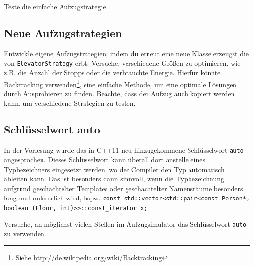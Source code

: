 \begin{algorithm}[H]
 \SetAlgoLined
\end{algorithm}

Teste die einfache Aufzugstrategie

\subsection{Neue Aufzugstrategien}
Entwickle eigene Aufzugstrategien, indem du erneut eine neue Klasse erzeugst die von \lstinline{ElevatorStrategy} erbt.
Versuche, verschiedene Größen zu optimieren, wie z.B. die Anzahl der Stopps oder die verbrauchte Energie.
Hierfür könnte Backtracking verwenden\footnote{Siehe \url{http://de.wikipedia.org/wiki/Backtracking}}, eine einfache Methode, um eine optimale Lösungen durch Ausprobieren zu finden.
Beachte, dass der Aufzug auch kopiert werden kann, um verschiedene Strategien zu testen.

\subsection{Schlüsselwort auto}
In der Vorlesung wurde das in C++11 neu hinzugekommene Schlüsselwort \lstinline{auto} angesprochen.
Dieses Schlüsselwort kann überall dort anstelle eines Typbezeichners eingesetzt werden, wo der Compiler den Typ automatisch ableiten kann.
Das ist besonders dann sinnvoll, wenn die Typbezeichnung aufgrund geschachtelter Templates oder geschachtelter Namensräume besonders lang und unleserlich wird, bspw. \lstinline{const std::vector<std::pair<const Person*, boolean (Floor, int)>>::const_iterator x;}.

Versuche, an möglichst vielen Stellen im Aufzugsimulator das Schlüsselwort \lstinline{auto} zu verwenden.
